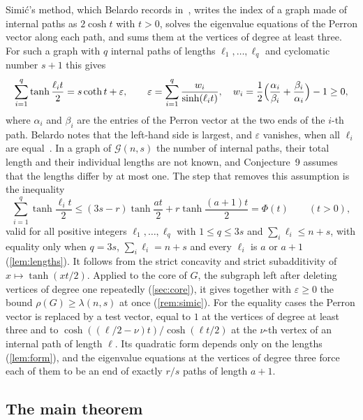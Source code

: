 \documentclass[11pt]{article}
\theoremstyle{definition}
\theoremstyle{remark}
\newcommand{\G}{\mathcal{G}}
\begin{document}
Simi\'c's method, which Belardo records in~\cite[pp.~99--101]{Be19}, writes the index of a graph made of internal
paths as $2\cosh t$ with $t>0$, solves the eigenvalue equations of the Perron vector along each path, and sums them at
the vertices of degree at least three. For such a graph with $q$ internal paths of lengths $\ell_1,\dots,\ell_q$ and
cyclomatic number $s+1$ this gives~\cite[eq.~(2)]{Be19}
\begin{equation}\label{eq:simic}
\sum_{i=1}^q\tanh\frac{\ell_it}{2}=s\coth t+\varepsilon,\qquad\varepsilon=\sum_{i=1}^q\frac{w_i}{\sinh(\ell_it)},\quad
w_i=\frac12\Bigl(\frac{\alpha_i}{\beta_i}+\frac{\beta_i}{\alpha_i}\Bigr)-1\ge0,
\end{equation}
where $\alpha_i$ and $\beta_i$ are the entries of the Perron vector at the two ends of the $i$-th path. Belardo notes
that the left-hand side is largest, and $\varepsilon$ vanishes, when all $\ell_i$ are equal~\cite[p.~101]{Be19}. In a graph
of $\G(n,s)$ the number of internal paths, their total length and their individual lengths are not known, and
Conjecture~9 assumes that the lengths differ by at most one. The step that removes this assumption is the inequality
\begin{equation}\label{eq:keyineq}
\sum_{i=1}^q\tanh\frac{\ell_it}{2}\le(3s-r)\tanh\frac{at}{2}+r\tanh\frac{(a+1)t}{2}=\Phi(t)\qquad(t>0),
\end{equation}
valid for all positive integers $\ell_1,\dots,\ell_q$ with $1\le q\le3s$ and $\sum_i\ell_i\le n+s$, with equality only
when $q=3s$, $\sum_i\ell_i=n+s$ and every $\ell_i$ is $a$ or $a+1$ (\cref{lem:lengths}). It follows from the strict
concavity and strict subadditivity of $x\mapsto\tanh(xt/2)$. Applied to the core of $G$, the subgraph left after deleting vertices of degree one repeatedly
(\cref{sec:core}), it gives together with $\varepsilon\ge0$ the bound $\rho(G)\ge\lambda(n,s)$ at once (\cref{rem:simic}). For the equality cases the Perron
vector is replaced by a test vector, equal to $1$ at the vertices of degree at least three and to
$\cosh((\ell/2-\nu)t)/\cosh(\ell t/2)$ at the $\nu$-th vertex of an internal path of length $\ell$. Its quadratic form
depends only on the lengths (\cref{lem:form}), and the eigenvalue equations at the vertices of degree three force each
of them to be an end of exactly $r/s$ paths of length $a+1$.

\subsection{The main theorem}\label{sec:mainresult}
\end{document}
